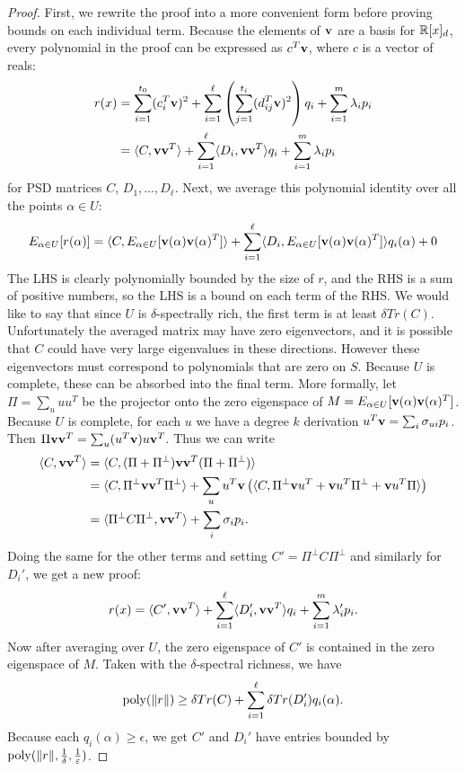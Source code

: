 \begin{proof}
First, we rewrite the proof into a more convenient form before proving bounds on each individual term. Because the elements of ${\bf v}$ are a basis for $\mathbb R[x]_d$, every polynomial in the proof can be expressed as $c^T{\bf v}$, where $c$ is a vector of reals:
\begin{align*} r(x) &= \sum_{i=1}^{t_0} (c_i^T{\bf v})^2 + \sum_{i=1}^\ell \left(\sum_{j=1}^{t_i} (d_{ij}^T{\bf v})^2\right)q_i + \sum_{i=1}^m \lambda_i p_i \\
&= \langle C, {\bf v}{\bf v}^T\rangle + \sum_{i=1}^\ell \langle D_i, {\bf v}{\bf v}^T\rangle q_i + \sum_{i=1}^m \lambda_i p_i
\end{align*}
for PSD matrices $C$, $D_1,\dots,D_\ell$. Next, we average this polynomial identity over all the points $\alpha \in U$:
\begin{align*}
E_{\alpha \in U}[r(\alpha)] &= \langle C, E_{\alpha \in U}[{\bf v}(\alpha){\bf v}(\alpha)^T]\rangle + \sum_{i=1}^\ell \langle D_i, E_{\alpha \in U}[{\bf v}(\alpha){\bf v}(\alpha)^T]\rangle q_i(\alpha) + 0 \\
\end{align*}
The LHS is clearly polynomially bounded by the size of $r$, and the RHS is a sum of positive numbers, so the LHS is a bound on each term of the RHS. We would like to say that since $U$ is $\delta$-spectrally rich, the first term is at least $\delta Tr(C)$. Unfortunately the averaged matrix may have zero eigenvectors, and it is possible that $C$ could have very large eigenvalues in these directions. However these eigenvectors must correspond to polynomials that are zero on $S$. Because $U$ is complete, these can be absorbed into the final term. More formally, let $\Pi = \sum_u uu^T$ be the projector onto the zero eigenspace of $M = E_{\alpha \in U}[{\bf v}(\alpha){\bf v}(\alpha)^T]$. Because $U$ is complete, for each $u$ we have a degree $k$ derivation $u^T{\bf v} = \sum_i \sigma_{ui} p_i$. Then $\Pi {\bf v}{\bf v}^T = \sum_u (u^T{\bf v}) u{\bf v}^T$. Thus we can write
\begin{align*}
\langle C, {\bf v}{\bf v}^T\rangle &= \langle C, (\Pi + \Pi^\perp){\bf v}{\bf v}^T(\Pi + \Pi^\perp)\rangle \\
&= \langle C, \Pi^\perp {\bf v}{\bf v}^T \Pi^\perp\rangle + \sum_u u^T{\bf v}\left(\langle C, \Pi^\perp {\bf v}u^T + {\bf v}u^T\Pi^\perp + {\bf v}u^T\Pi\rangle\right) \\
&= \langle \Pi^\perp C \Pi^\perp, {\bf v}{\bf v}^T\rangle + \sum_i \sigma_i p_i.
\end{align*}
Doing the same for the other terms and setting $C' = \Pi^\perp C \Pi^\perp$ and similarly for $D_i'$, we get a new proof:
\[r(x) = \langle C', {\bf v}{\bf v}^T\rangle + \sum_{i=1}^\ell \langle D_i', {\bf v}{\bf v}^T\rangle q_i + \sum_{i=1}^m \lambda_i' p_i.\]
Now after averaging over $U$, the zero eigenspace of $C'$ is contained in the zero eigenspace of $M$. Taken with the $\delta$-spectral richness, we have
\[\operatorname{poly}(\|r\|) \geq \delta Tr(C) + \sum_{i=1}^\ell \delta Tr(D_i') q_i(\alpha).\]
Because each $q_i(\alpha) \geq \epsilon$, we get $C'$ and $D_i'$ have entries bounded by $\operatorname{poly}(\|r\|, \frac{1}{\delta}, \frac{1}{\varepsilon})$.


\end{proof}
